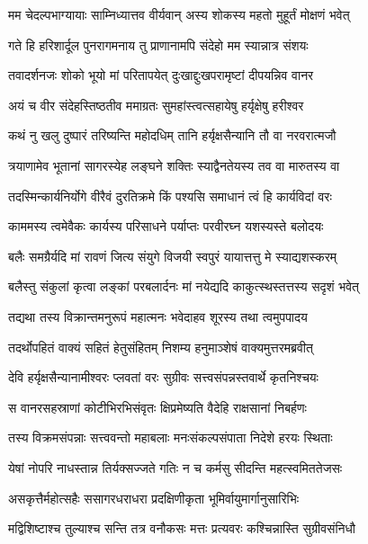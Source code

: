 \twolineshloka
{मम चेदल्पभाग्यायाः साम्निध्यात्तव वीर्यवान्}
{अस्य शोकस्य महतो मुहूर्तं मोक्षणं भवेत्} %

\twolineshloka
{गते हि हरिशार्दूल पुनरागमनाय तु}
{प्राणानामपि संदेहो मम स्यान्नात्र संशयः} %

\twolineshloka
{तवादर्शनजः शोको भूयो मां परितापयेत्}
{दुःखाद्दुःखपरामृष्टां दीपयन्निव वानर} %

\twolineshloka
{अयं च वीर संदेहस्तिष्ठतीव ममाग्रतः}
{सुमहांस्त्वत्सहायेषु हर्यृक्षेषु हरीश्वर} %

\twolineshloka
{कथं नु खलु दुष्पारं तरिष्यन्ति महोदधिम्}
{तानि हर्यृक्षसैन्यानि तौ वा नरवरात्मजौ} %

\twolineshloka
{त्रयाणामेव भूतानां सागरस्येह लङ्घने}
{शक्तिः स्याद्वैनतेयस्य तव वा मारुतस्य वा} %

\twolineshloka
{तदस्मिन्कार्यनिर्योगे वीरैवं दुरतिक्रमे}
{किं पश्यसि समाधानं त्वं हि कार्यविदां वरः} %

\twolineshloka
{काममस्य त्वमेवैकः कार्यस्य परिसाधने}
{पर्याप्तः परवीरघ्न यशस्यस्ते बलोदयः} %

\twolineshloka
{बलैः समग्रैर्यदि मां रावणं जित्य संयुगे}
{विजयी स्वपुरं यायात्तत्तु मे स्याद्यशस्करम्} %

\twolineshloka
{बलैस्तु संकुलां कृत्वा लङ्कां परबलार्दनः}
{मां नयेद्यदि काकुत्स्थस्तत्तस्य सदृशं भवेत्} %

\twolineshloka
{तद्यथा तस्य विक्रान्तमनुरूपं महात्मनः}
{भवेदाहव शूरस्य तथा त्वमुपपादय} %

\twolineshloka
{तदर्थोपहितं वाक्यं सहितं हेतुसंहितम्}
{निशम्य हनुमाञ्शेषं वाक्यमुत्तरमब्रवीत्} %

\twolineshloka
{देवि हर्यृक्षसैन्यानामीश्वरः प्लवतां वरः}
{सुग्रीवः सत्त्वसंपन्नस्तवार्थे कृतनिश्चयः} %

\twolineshloka
{स वानरसहस्राणां कोटीभिरभिसंवृतः}
{क्षिप्रमेष्यति वैदेहि राक्षसानां निबर्हणः} %

\twolineshloka
{तस्य विक्रमसंपन्नाः सत्त्ववन्तो महाबलाः}
{मनःसंकल्पसंपाता निदेशे हरयः स्थिताः} %

\twolineshloka
{येषां नोपरि नाधस्तान्न तिर्यक्सज्जते गतिः}
{न च कर्मसु सीदन्ति महत्स्वमिततेजसः} %

\twolineshloka
{असकृत्तैर्महोत्सहैः ससागरधराधरा}
{प्रदक्षिणीकृता भूमिर्वायुमार्गानुसारिभिः} %

\twolineshloka
{मद्विशिष्टाश्च तुल्याश्च सन्ति तत्र वनौकसः}
{मत्तः प्रत्यवरः कश्चिन्नास्ति सुग्रीवसंनिधौ} %

